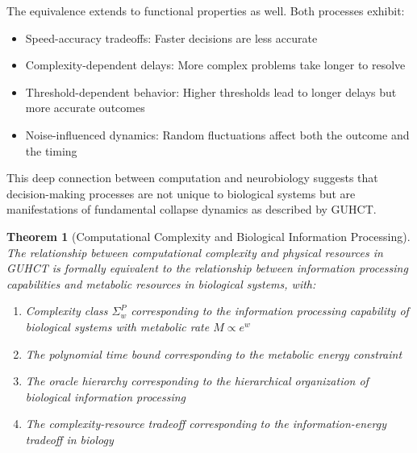 \documentclass[11pt,a4paper]{article}
\makeatletter
\newtheorem{theorem}{Theorem}[section]
\renewenvironment{proof}[1][\proofname]{\par
  \pushQED{\qed}%
  \normalfont \topsep6\p@\@plus6\p@\relax
  \trivlist
  \item[\hskip\labelsep
        \itshape
    #1\@addpunct{.}]\ignorespaces
}{%
  \popQED\endtrivlist\@endpefalse
}
\makeatother
\begin{document}
\begin{proof}
The equivalence extends to functional properties as well. Both processes exhibit:
\begin{itemize}
    \item Speed-accuracy tradeoffs: Faster decisions are less accurate
    \item Complexity-dependent delays: More complex problems take longer to resolve
    \item Threshold-dependent behavior: Higher thresholds lead to longer delays but more accurate outcomes
    \item Noise-influenced dynamics: Random fluctuations affect both the outcome and the timing
\end{itemize}

This deep connection between computation and neurobiology suggests that decision-making processes are not unique to biological systems but are manifestations of fundamental collapse dynamics as described by GUHCT.
\end{proof}

\begin{theorem}[Computational Complexity and Biological Information Processing]
\label{thm:complexity_biology}
The relationship between computational complexity and physical resources in GUHCT is formally equivalent to the relationship between information processing capabilities and metabolic resources in biological systems, with:
\begin{enumerate}
    \item Complexity class $\Sigma_w^P$ corresponding to the information processing capability of biological systems with metabolic rate $M \propto e^w$
    \item The polynomial time bound corresponding to the metabolic energy constraint
    \item The oracle hierarchy corresponding to the hierarchical organization of biological information processing
    \item The complexity-resource tradeoff corresponding to the information-energy tradeoff in biology
\end{enumerate}
\end{theorem}
\end{document}
